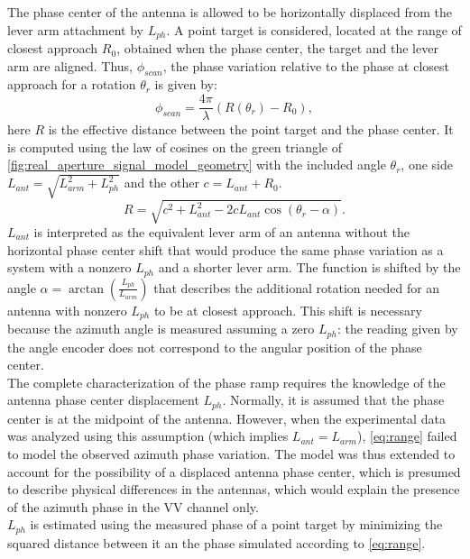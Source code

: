 The phase center of the antenna is allowed to be horizontally displaced from the lever arm attachment by $L_{ph}$.
A point target is considered, located at the  range of closest approach $R_{0}$, obtained when the phase center, the target and the lever arm are aligned. Thus, $\phi_{scan}$, the phase variation relative to the phase at closest approach for a rotation  $\theta_r$  is given by:
\begin{equation}\label{eq:range_phase}
	\phi_{scan} = \frac{4 \pi}{\lambda}\left(R\left(\theta_r\right) - R_0\right),
\end{equation}
here $R$ is the effective distance between the point target and the phase center.
It is computed using the law of cosines on the green triangle of \autoref{fig:real_aperture_signal_model_geometry} with the included angle $\theta_r$, one  side $L_{ant} = \sqrt{L_{arm}^2 + L_{ph}^2}$ and the other $c = L_{ant} + R_0$.
\begin{equation}\label{eq:range}
	R = \sqrt{ c^2 +  L_{ant}^2 - 2 c L_{ant} \cos{\left(\theta_r - \alpha\right)}}.
\end{equation}
$L_{ant}$ is interpreted as the equivalent lever arm of an antenna without the horizontal phase center shift that would produce the same phase variation as a system with a nonzero $L_{ph}$ and a shorter lever arm.
The function is shifted by the angle  $\alpha = \operatorname{\arctan}\left({\frac{L_{ph}}{L_{arm}}}\right)$ that describes the additional rotation needed for an antenna with nonzero $L_{ph}$ to be at closest approach. This shift is necessary because the azimuth angle is measured assuming a zero $L_{ph}$: the reading given by the angle encoder does not correspond to the angular position of the phase center.\\
The complete characterization of the phase ramp requires the knowledge of the antenna phase center displacement $L_{ph}$. Normally, it is assumed that the phase center is at the midpoint of the antenna. However, when the experimental data was analyzed using this assumption (which implies $L_{ant} = L_{arm}$),  \autoref{eq:range} failed to model the observed azimuth phase variation. The model was thus extended to account for the possibility of a displaced antenna phase center, which is presumed to describe physical differences in the antennas, which would explain the presence of the azimuth phase in the VV channel only.\\ $L_{ph}$ is estimated using the measured phase of a point target by minimizing the squared distance between it an the phase simulated according to \autoref{eq:range}.
